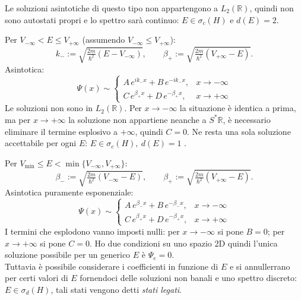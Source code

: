 Le soluzioni asintotiche di questo tipo non appartengono a \(L_2(\mathbb{R})\), quindi non sono autostati propri e lo spettro
sarà continuo: \(E \in \sigma_c(H)\) e \(d(E)= 2\).

Per \(V_{-\infty} < E \le V_{+\infty}\) (assumendo \(V_{-\infty}\le V_{+\infty}\)):
\[
k_- := \sqrt{\tfrac{2m}{\hbar^2}(E - V_{-\infty})}, 
\qquad
\beta_+ := \sqrt{\tfrac{2m}{\hbar^2}(V_{+\infty} - E)}.
\]
Asintotica:
\[
\Psi(x)\sim 
\begin{cases}
A\,e^{ik_- x} + B\,e^{-ik_- x}, & x\to -\infty \\[4pt]
C\,e^{\beta_+ x} + D\,e^{-\beta_+ x}, & x\to +\infty
\end{cases}
\]
Le soluzioni non sono in \(L_2(\mathbb{R})\). Per \(x\to - \infty\) la situazione è identica a prima, ma per \(x\to + \infty\) la soluzione non appartiene neanche a \(S^*\mathbb{R}\),
è necessario eliminare il termine esplosivo a \(+\infty\), quindi \(C=0\). 
Ne resta una sola soluzione accettabile per ogni \(E\): \(E \in \sigma_c(H), \ d(E)=1 \) . 



\medskip
Per \(V_{\min} \le E < \min\{V_{-\infty},V_{+\infty}\}\):
\[
\beta_- := \sqrt{\tfrac{2m}{\hbar^2}(V_{-\infty}-E)}, \qquad
\beta_+ := \sqrt{\tfrac{2m}{\hbar^2}(V_{+\infty}-E)}.
\]
Asintotica puramente esponenziale:
\[
\Psi(x)\sim 
\begin{cases}
A\,e^{\beta_- x} + B\,e^{-\beta_- x}, & x\to -\infty \\[4pt]
C\,e^{\beta_+ x} + D\,e^{-\beta_+ x}, & x\to +\infty
\end{cases}
\]
I termini che esplodono vanno imposti nulli: per \(x\to -\infty\) si pone \(B=0\); per \(x\to +\infty\) si pone \(C=0\).
Ho due condizioni su uno spazio 2D quindi l'unica soluzione possibile per un generico \(E\) è \(\Psi_e=0\).\\
Tuttavia è possibile considerare i coefficienti in funzione di \(E\) e si annullerrano per certi valori di \(E\) fornendoci delle soluzioni non banali e uno spettro discreto:
\(E \in \sigma_d(H)\), tali stati vengono detti \textit{stati legati}.












